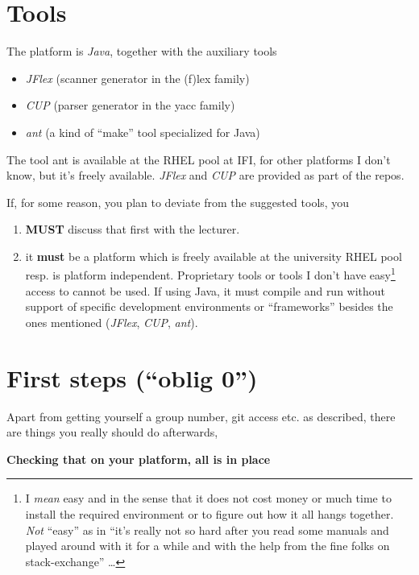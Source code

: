 \documentclass[10pt,freeform]{handout}[2014/08/13]
\begin{document}
\section{Tools}

The platform is \emph{Java}, together with the auxiliary tools

\begin{itemize}
\item \textsl{JFlex} (scanner generator in the (f)lex family)
\item \textsl{CUP} (parser generator in the yacc family)
\item \textsl{ant} (a kind of ``make'' tool specialized for Java)
\end{itemize}


The tool ant is available at the RHEL pool at IFI, for other platforms I
don't know, but it's freely available. \textsl{JFlex} and \textsl{CUP} are
provided as part of the repos.

If, for some reason, you plan to deviate from the suggested tools, you
\begin{enumerate}
\item \textbf{MUST} discuss that first with the lecturer.
\item it \textbf{must} be a platform which is freely available at the
  university RHEL pool resp. is platform independent. Proprietary tools or
  tools I don't have easy\footnote{I \emph{mean} easy and in the sense that
    it does not cost money or much time to install the required environment
    or to figure out how it all hangs together. \emph{Not} ``easy'' as in
    ``it's really not so hard after you read some manuals and played around
    with it for a while and with the help from the fine folks on
    stack-exchange'' \ldots} access to cannot be used. If using Java, it
  must compile and run without support of specific development environments
  or ``frameworks'' besides the ones mentioned (\textsl{JFlex},
  \textsl{CUP}, \textsl{ant}).
\end{enumerate}


\section{First steps (``oblig 0'')}
\label{sec:first-steps-oblig}

Apart from getting yourself a group number, git access etc. as described,
there are things you really should do afterwards, 

\begin{center}
  \textbf{Checking that on your platform, all is in place}
\end{center}
\end{document}
